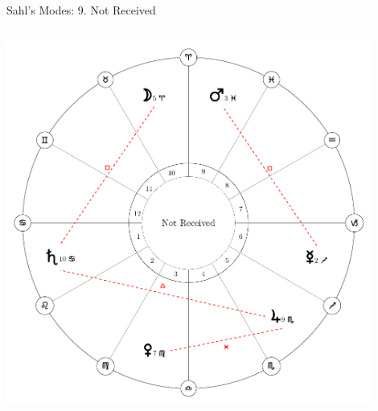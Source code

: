 \begin{frame}[t]{Sahl's Modes: 9. Not Received}
\begin{columns}[T, onlytextwidth]
\begin{center}
{\includegraphics[width=0.9\textwidth]{charts/66-not-received}} \\
\end{center}
\end{columns}
\end{frame}
